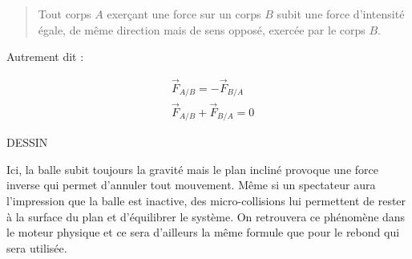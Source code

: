 \begin{quote}
Tout corps $A$ exerçant une force sur un corps $B$ subit une force d'intensité égale, de même direction mais de sens opposé, exercée par le corps $B$.
\end{quote}

Autrement dit :

\begin{align*}
  &\vec{F}_{A/B} = -\vec{F}_{B/A} \\
  &\vec{F}_{A/B} + \vec{F}_{B/A} = 0
\end{align*}

DESSIN

Ici, la balle subit toujours la gravité mais le plan incliné provoque une force inverse qui permet d'annuler tout mouvement. Même si un spectateur aura l'impression que la balle est inactive, des micro-collisions lui permettent de rester à la surface du plan et d'équilibrer le système. On retrouvera ce phénomène dans le moteur physique et ce sera d'ailleurs la même formule que pour le rebond qui sera utilisée.
